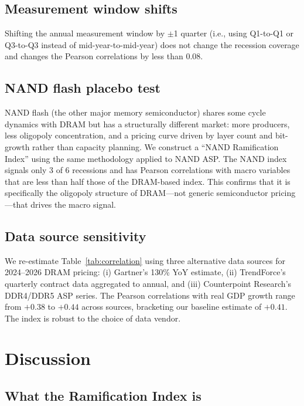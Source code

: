\documentclass[12pt]{article}
\theoremstyle{definition}
\begin{document}
\subsection{Measurement window shifts}

Shifting the annual measurement window by $\pm$1 quarter (i.e., using Q1-to-Q1 or Q3-to-Q3 instead of mid-year-to-mid-year) does not change the recession coverage and changes the Pearson correlations by less than 0.08.

\subsection{NAND flash placebo test}

NAND flash (the other major memory semiconductor) shares some cycle dynamics with DRAM but has a structurally different market: more producers, less oligopoly concentration, and a pricing curve driven by layer count and bit-growth rather than capacity planning. We construct a ``NAND Ramification Index'' using the same methodology applied to NAND ASP. The NAND index signals only 3 of 6 recessions and has Pearson correlations with macro variables that are less than half those of the DRAM-based index. This confirms that it is specifically the oligopoly structure of DRAM---not generic semiconductor pricing---that drives the macro signal.

\subsection{Data source sensitivity}

We re-estimate Table~\ref{tab:correlation} using three alternative data sources for 2024--2026 DRAM pricing: (i) Gartner's 130\% YoY estimate, (ii) TrendForce's quarterly contract data aggregated to annual, and (iii) Counterpoint Research's DDR4/DDR5 ASP series. The Pearson correlations with real GDP growth range from $+0.38$ to $+0.44$ across sources, bracketing our baseline estimate of $+0.41$. The index is robust to the choice of data vendor.


\section{Discussion}
\label{sec:discussion}

\subsection{What the Ramification Index is}
\end{document}

